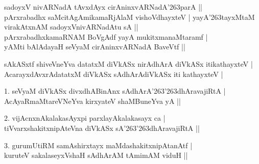 \begin{entry}
\begin{shl}
sadoyxV nivARNadA tAvxdAyx cirAninxvARNadA\char'263parA ||\\
pArxrabadhx saMcitAgAmikamaRjAlaM vishoVdhayxteV |
yayA\char'263tayxMtaM virakAtxnAM sadoyxVnivARNadAtu sA ||\\
pArxrabadhxkamaRNAM BoVgAdf yayA mukitxmanaMtaramf |\\
yAMti bAlAdayaH seVyaM cirAninxvARNadA BaveVtf || 
\end{shl}
\begin{shl}
sAkASxtf shiveVneYva datatxM diVkASx nirAdhArA diVkASx itikathayxteV |\\
AcarayxdAvxrAdatatxM diVkASx sAdhArAdiVkASx iti kathayxteV |
\end{shl}
\begin{shl}
1. seVyaM diVkASx divxdhABinAnx sAdhArA\char'263\char'263dhAravajiRtA |\\
AcAyaRmaMtareVNeYva kirxyateV shaMBuneYva yA ||
\end{shl}
\begin{shl}
2. vijAcnxnAkalakasAyxpi parxlayAkalakasayx ca |\\
tiVvarxshakitxnipAteVna diVkASx sA\char'263\char'263dhAravajiRtA ||
\end{shl}
\begin{shl}
3. gurumUtiRM samAshirxtayx maMdashakitxnipAtanAtf |\\
kuruteV sakalaseyxVshaH sAdhArAM tAmimAM viduH ||
\end{shl}
\end{entry}

